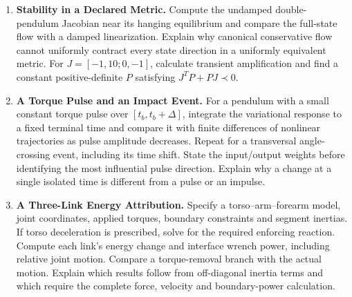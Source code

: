 \begin{enumerate}
\item\label{ex:ch7:contraction} \textbf{Stability in a Declared Metric.} Compute the undamped double-pendulum Jacobian near its hanging equilibrium and compare the full-state flow with a damped linearization. Explain why canonical conservative flow cannot uniformly contract every state direction in a uniformly equivalent metric. For $J=[-1,10;0,-1]$, calculate transient amplification and find a constant positive-definite $P$ satisfying $J^TP+PJ\prec0$.
\item\label{ex:ch7:pulse} \textbf{A Torque Pulse and an Impact Event.} For a pendulum with a small constant torque pulse over $[t_b,t_b+\Delta]$, integrate the variational response to a fixed terminal time and compare it with finite differences of nonlinear trajectories as pulse amplitude decreases. Repeat for a transversal angle-crossing event, including its time shift. State the input/output weights before identifying the most influential pulse direction. Explain why a change at a single isolated time is different from a pulse or an impulse.
\item\label{ex:ch7:chain} \textbf{A Three-Link Energy Attribution.} Specify a torso--arm--forearm model, joint coordinates, applied torques, boundary constraints and segment inertias. If torso deceleration is prescribed, solve for the required enforcing reaction. Compute each link's energy change and interface wrench power, including relative joint motion. Compare a torque-removal branch with the actual motion. Explain which results follow from off-diagonal inertia terms and which require the complete force, velocity and boundary-power calculation.
\end{enumerate}
